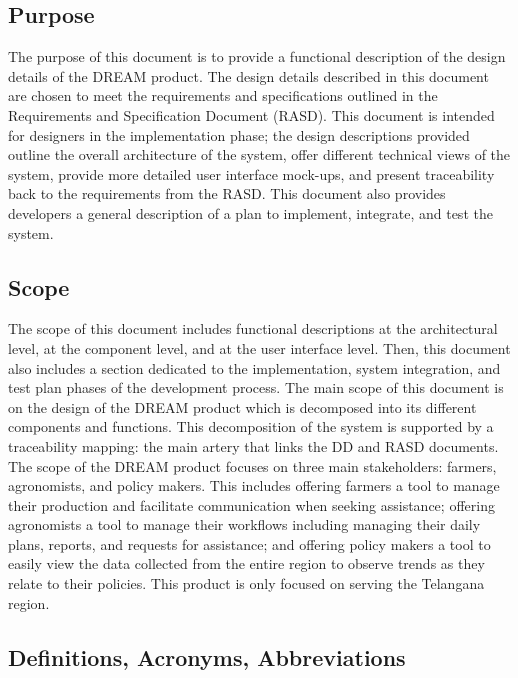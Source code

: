 \subsection{Purpose}
\begin{flushleft}
The purpose of this document is to provide a functional description of the design details of the DREAM product. The design details described in this document are chosen to meet the requirements and specifications outlined in the Requirements and Specification Document (RASD). This document is intended for designers in the implementation phase; the design descriptions provided outline the overall architecture of the system, offer different technical views of the system, provide more detailed user interface mock-ups, and present traceability back to the requirements from the RASD. This document also provides developers a general description of a plan to implement, integrate, and test the system.
\end{flushleft}

\subsection{Scope}
\begin{flushleft}
The scope of this document includes functional descriptions at the architectural level, at the component level, and at the user interface level. Then, this document also includes a section dedicated to the implementation, system integration, and test plan phases of the development process. The main scope of this document is on the design of the DREAM product which is decomposed into its different components and functions. This decomposition of the system is supported by a traceability mapping: the main artery that links the DD and RASD documents. \\
The scope of the DREAM product focuses on three main stakeholders: farmers, agronomists, and policy makers. This includes offering farmers a tool to manage their production and facilitate communication when seeking assistance; offering agronomists a tool to manage their workflows including managing their daily plans, reports, and requests for assistance; and offering policy makers a tool to easily view the data collected from the entire region to observe trends as they relate to their policies. This product is only focused on serving the Telangana region. 

\end{flushleft}

\subsection{Definitions, Acronyms, Abbreviations}

